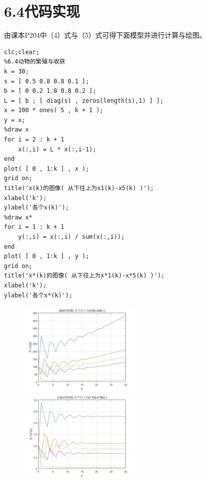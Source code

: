 \documentclass{ctexart}
\begin{document}
\section{6.4代码实现}
由课本P204中（4）式与（5）式可得下面模型并进行计算与绘图。
\begin{lstlisting}
clc;clear;
%6.4动物的繁殖与收获
k = 30;
s = [ 0.5 0.8 0.8 0.1 ];
b = [ 0 0.2 1.8 0.8 0.2 ];
L = [ b ; [ diag(s) , zeros(length(s),1) ] ];
x = 100 * ones( 5 , k + 1 );
y = x;
%draw x
for i = 2 : k + 1
    x(:,i) = L * x(:,i-1);
end
plot( [ 0 , 1:k ] , x );
grid on;
title('x(k)的图像( 从下往上为x1(k)-x5(k) )');
xlabel('k');
ylabel('各个x(k)');
%draw x*
for i = 1 : k + 1
    y(:,i) = x(:,i) / sum(x(:,i));
end
plot( [ 0 , 1:k ] , y );
grid on;
title('x*(k)的图像( 从下往上为x*1(k)-x*5(k) )');
xlabel('k');
ylabel('各个x*(k)');
\end{lstlisting}
\begin{figure}[htbp]
\centering
\begin{minipage}[t]{0.48\textwidth}
\centering
\includegraphics[width=6cm]{xk.jpg}
\end{minipage}
\begin{minipage}[t]{0.48\textwidth}
\centering
\includegraphics[width=6cm]{xkk.jpg}
\end{minipage}
\end{figure}
\end{document}
